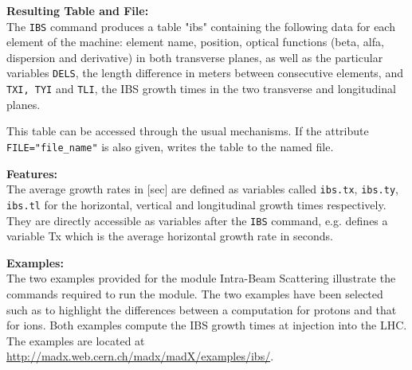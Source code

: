 \textbf{Resulting Table and File:} \\
The \texttt{IBS} command produces a table "ibs" containing the following
data for 
each element of the machine: element name, position, optical functions
(beta, alfa, dispersion and derivative) in both transverse planes, as
well as the particular variables \texttt{DELS}, the length difference in
meters between consecutive elements, and \texttt{TXI, TYI} and
\texttt{TLI}, the IBS growth times in the two transverse and
longitudinal planes.  

This table can be accessed through the usual mechanisms. If the
attribute \texttt{FILE="file\_name"} is also given, \madx writes the
table to the named file.  



\textbf{Features:} \\
The average growth rates in [sec] are defined as variables called
\texttt{ibs.tx}, \texttt{ibs.ty}, \texttt{ibs.tl} for the horizontal,
vertical and longitudinal growth times respectively. They are directly
accessible as variables after the \texttt{IBS} command, e.g.
defines a variable Tx which is the average horizontal growth rate in seconds. 



\textbf{Examples:} \\
The two examples provided for the module Intra-Beam Scattering
illustrate the commands required to run the module. The two examples
have been selected such as to highlight the differences between a
computation for protons and that for ions. Both examples compute the IBS
growth times at injection into the LHC.\\
The examples are located at
\href{http://madx.web.cern.ch/madx/madX/examples/ibs/}{http://madx.web.cern.ch/madx/madX/examples/ibs/}. 


